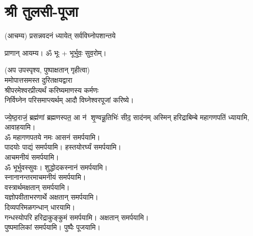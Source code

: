 
\setlength{\parindent}{0pt}
\chapter{श्री तुलसी-पूजा}


(आचम्य)
{प्रसन्नवदनं ध्यायेत् सर्वविघ्नोपशान्तये}
 
प्राणान्  आयम्य।  ॐ भूः + भूर्भुवः॒ सुव॒रोम्।

(अप उपस्पृश्य, पुष्पाक्षतान् गृहीत्वा)\\
ममोपात्तसमस्त दुरितक्षयद्वारा \\
श्रीपरमेश्वरप्रीत्यर्थं करिष्यमाणस्य कर्मणः\\
 निर्विघ्नेन परिसमाप्त्यर्थम् आदौ विघ्नेश्वरपूजां करिष्ये।

{ज्ये॒ष्ठ॒राजं॒ ब्रह्म॑णां ब्रह्मणस्पत॒ आ न॑ शृ॒ण्वन्नू॒तिभिः॑ सीद॒ साद॑नम्}
अस्मिन् हरिद्राबिम्बे महागणपतिं ध्यायामि, आवाहयामि।\\


ॐ महागणपतये नमः  आसनं समर्पयामि।\\
पादयोः पाद्यं समर्पयामि। हस्तयोरर्घ्यं समर्पयामि।\\
आचमनीयं समर्पयामि।\\
ॐ भूर्भुवस्सुवः। शुद्धोदकस्नानं समर्पयामि।\\
स्नानानन्तरमाचमनीयं समर्पयामि।\\
वस्त्रार्थमक्षतान् समर्पयामि।\\
यज्ञोपवीताभरणार्थे अक्षतान् समर्पयामि।\\
दिव्यपरिमळगन्धान् धारयामि।\\
गन्धस्योपरि हरिद्राकुङ्कुमं समर्पयामि। अक्षतान् समर्पयामि। \\
पुष्पमालिकां समर्पयामि। पुष्पैः पूजयामि।

